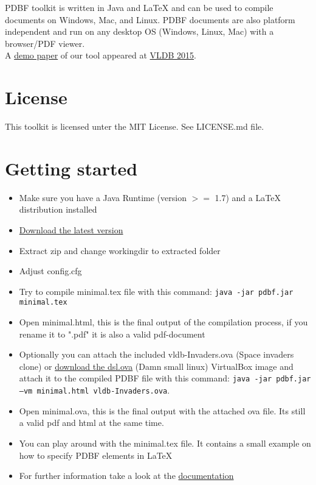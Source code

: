 \documentclass[11pt]{article}
\begin{document}
\noindent PDBF toolkit is written in Java and LaTeX and can be used to compile documents on Windows, Mac, and Linux. PDBF documents are also platform independent and run on any desktop OS (Windows, Linux, Mac) with a browser/PDF viewer.\\

\noindent A \href{https://infosys.uni-saarland.de/publications/p1972-dittrich.html}{demo paper} of our tool appeared at \href{http://www.vldb.org/2015/}{VLDB 2015}. 

\section{License}
\noindent This toolkit is licensed unter the MIT License. See LICENSE.md file.\\

\newpage

\section{Getting started}
\begin{itemize}
\item Make sure you have a Java Runtime (version $>=$ 1.7) and a LaTeX distribution installed
\item \href{https://github.com/uds-datalab/PDBF/archive/gh-pages.zip}{Download the latest version}
\item Extract zip and change workingdir to extracted folder
\item Adjust config.cfg
\item Try to compile minimal.tex file with this command: \texttt{java -jar pdbf.jar minimal.tex}
\item Open minimal.html, this is the final output of the compilation process, if you rename it to ".pdf" it is also a valid pdf-document
\item Optionally you can attach the included vldb-Invaders.ova (Space invaders clone) or \href{https://github.com/uds-datalab/PDBF/releases/download/1.0.1/dsl.ova}{download the dsl.ova} (Damn small linux) VirtualBox image and attach it to the compiled PDBF file with this command: \texttt{java -jar pdbf.jar --vm minimal.html vldb-Invaders.ova}.
\item Open minimal.ova, this is the final output with the attached ova file. Its still a valid pdf and html at the same time.
\item You can play around with the minimal.tex file. It contains a small example on how to specify PDBF elements in LaTeX
\item For further information take a look at the \href{http://uds-datalab.github.io/PDBF/}{documentation}
\end{itemize}
\end{document}
